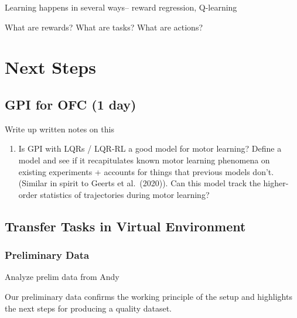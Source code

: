 {            Learning happens in several ways-- reward regression,
            Q-learning

            What are rewards? What are tasks? What are actions?

            \hypertarget{next-steps}{%
            \section{Next Steps}\label{next-steps}}

            \hypertarget{gpi-for-ofc-1-day}{%
            \subsection{GPI for OFC (1 day)}\label{gpi-for-ofc-1-day}}

            Write up written notes on this

            \begin{enumerate}
            \def\labelenumi{\arabic{enumi}.}
            \setcounter{enumi}{1}
            \tightlist
            \item
              Is GPI with LQRs / LQR-RL a good model for motor learning?
              Define a model and see if it recapitulates known motor
              learning phenomena on existing experiments + accounts for
              things that previous models don't. (Similar in spirit to
              Geerts et al.~(2020)). Can this model track the
              higher-order statistics of trajectories during motor
              learning?
            \end{enumerate}

            \hypertarget{transfer-tasks-in-virtual-environment}{%
            \subsection{Transfer Tasks in Virtual
            Environment}\label{transfer-tasks-in-virtual-environment}}

            \hypertarget{preliminary-data}{%
            \subsubsection{Preliminary Data}\label{preliminary-data}}

            Analyze prelim data from Andy

            Our preliminary data confirms the working principle of the
            setup and highlights the next steps for producing a quality
            dataset.

}
